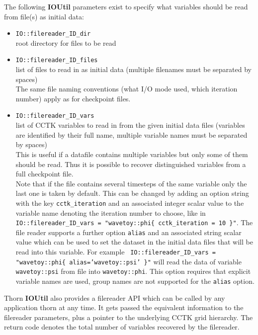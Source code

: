 \documentclass{article}
\begin{document}
The following {\bf IOUtil} parameters exist to specify what variables should be
read from file(s) as initial data:

\begin{itemize}
  \item {\tt IO::filereader\_ID\_dir}\\
    root directory for files to be read
  \item {\tt IO::filereader\_ID\_files}\\
    list of files to read in as initial data (multiple filenames must be
    separated by spaces)\\
    The same file naming conventions (what I/O mode used, which iteration
    number) apply as for checkpoint files.
  \item {\tt IO::filereader\_ID\_vars}\\
    list of CCTK variables to read in from the given initial data files
    (variables are identified by their full name, multiple variable names must
    be separated by spaces)\\
    This is useful if a datafile contains multiple variables but only some of
    them should be read. Thus it is possible to recover distinguished variables
    from a full checkpoint file.\\
    Note that if the file contains several timesteps of the same variable only
    the last one is taken by default. This can be changed by adding an option
    string with the key {\tt cctk\_iteration} and an associated integer scalar
    value to the variable name denoting the iteration number to choose, like in
    {\tt IO::filereader\_ID\_vars = "wavetoy::phi\{ cctk\_iteration = 10 \}"}.
    The file reader supports a further option {\tt alias} and an associated
    string scalar value which can be used to set the dataset in the initial
    data files that will be read into this variable. For example {\tt
    IO::filereader\_ID\_vars = "wavetoy::phi\{ alias='wavetoy::psi' \}"} will
    read the data of variable {\tt wavetoy::psi} from file into 
    {\tt wavetoy::phi}. This option requires that explicit variable names are
    used, group names are not supported for the {\tt alias} option.
\end{itemize}

Thorn {\bf IOUtil} also provides a filereader API which can be called
by any application thorn at any time. It gets passed the equivalent information
to the filereader parameters, plus a pointer to the underlying CCTK grid
hierarchy. The return code denotes the total number of variables recovered by
the filereader.
\end{document}
